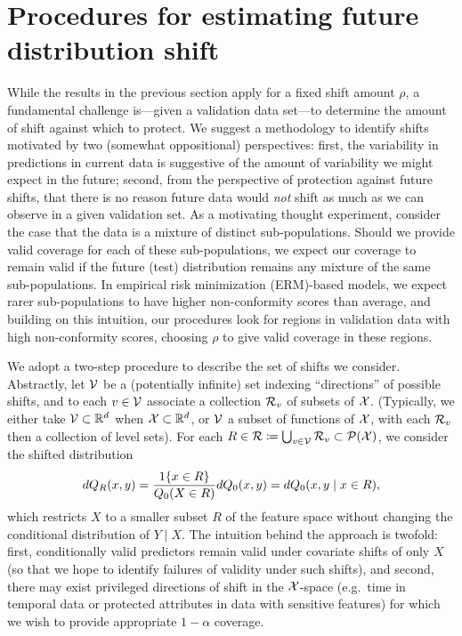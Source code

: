 
\section{Procedures for estimating future distribution shift}
\label{sec:futureshiftestimation}

While the results in the previous section apply for a fixed shift amount
$\rho$, a fundamental challenge is---given a validation data set---to
determine the amount of shift against which to protect.  We suggest a
methodology to identify shifts motivated by two
(somewhat oppositional) perspectives: first, the variability in predictions
in current data is suggestive of the amount of variability we might expect
in the future; second, from the perspective of protection against future
shifts, that there is no reason future data would \emph{not} shift as much
as we can observe in a given validation set.
%
As a motivating thought experiment, consider the case that the data is a
mixture of distinct sub-populations.  Should we provide valid coverage for
each of these sub-populations, we expect our coverage to remain valid if the
future (test) distribution remains any mixture of the same sub-populations.
In empirical risk minimization (ERM)-based models, we expect rarer
sub-populations to have higher non-conformity scores than average, and
building on this intuition, our procedures look for regions in validation
data with high non-conformity scores, choosing $\rho$ to give valid coverage
in these regions.

We adopt a two-step procedure to describe the set of shifts we consider.
Abstractly, let $\mathcal{V}$ be a (potentially infinite) set indexing
``directions'' of possible shifts, and to each $v \in \mathcal{V}$ associate a
collection $\mathcal{R}_v$ of subsets of $\mathcal{X}$.  (Typically, we either take
$\mathcal{V} \subset \mathbb{R}^d$ when $\mathcal{X} \subset \mathbb{R}^d$, or $\mathcal{V}$ a subset of
functions of $\mathcal{X}$, with each $\mathcal{R}_v$ then a collection of level
sets).  For each $R \in \mathcal{R} \coloneqq \bigcup_{v \in \mathcal{V}} \mathcal{R}_v
\subset \mathcal{P}(\mathcal{X})$, we consider the shifted distribution
\begin{align}
  \label{eqn:distribution-shifts-covariate}
  dQ_{R}(x,y) = \frac{1\!\left\{x \in R \right\}}{Q_0(X \in R)}dQ_0(x,y)
  = dQ_0(x,y \mid x \in R),
\end{align}
which restricts $X$ to a smaller subset $R$ of the feature space without
changing the conditional distribution of $Y \mid X$.  The intuition
behind the approach is twofold: first, conditionally
valid predictors remain valid under covariate shifts of only
$X$ (so that we hope to identify failures of validity under such shifts),
and second, there may exist 
privileged directions of shift in the
$\mathcal{X}$-space (e.g.\ time in temporal data or protected
attributes in data with sensitive features) for which we wish to provide
appropriate $1-\alpha$ coverage.

